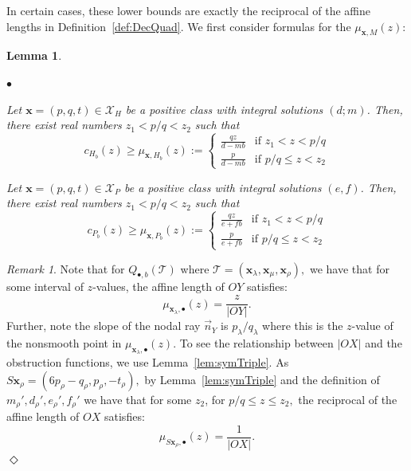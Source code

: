 \documentclass[11pt, reqno]{amsart}
\newtheorem{lemma}[thm]{Lemma}
\theoremstyle{remark}
\numberwithin{equation}{subsection}
\numberwithin{figure}{section}
\theoremstyle{customremark}
\newtheorem{rmk_no_diamond}[thm]{Remark}
\newenvironment{rmk}{\begin{rmk_no_diamond} } {\hfill$\er$ \end{rmk_no_diamond}}
\newcommand{\Tt}{\mathcal{T}}
\newenvironment{itemlist}
   { \begin{list} {$\bullet$}
         { \setlength{\topsep}{.5ex}  \setlength{\itemsep}{.5ex} \setlength{\leftmargin}{2.5ex} } }
   { \end{list} }
\newcommand{\vn}{{\vec{n}}}
\newcommand{\la}{{\lambda}}
\newcommand{\er}{{\Diamond}}
\newcommand{\X}{\mathcal{X}}
\begin{document}
In certain cases, these lower bounds are exactly the reciprocal of the affine lengths in Definition~\ref{def:DecQuad}. We first consider formulas for the $\mu_{\bm{x},M}(z)$:



\begin{lemma}\label{lem:obsFunction}
    \begin{itemlist}
        \item[{(i)}]\cite[Lemma 16]{ICERM} Let $\bm{x}=(p,q,t) \in \X_H$ be a positive class with integral solutions $(d;m)$. Then, there exist real numbers $z_1<p/q<z_2$ such that 
        \[ c_{H_b}(z) \geq \mu_{\bm{x},H_b}(z):=\begin{cases}
            \frac{qz}{d-mb} & \text{if $z_1<z<p/q$} \\
            \frac{p}{d-mb} & \text{if $p/q \leq z < z_2$}
        \end{cases}\]
        \item[{(ii)}] Let $\bm{x}=(p,q,t) \in \X_P$ be a positive class with integral solutions $(e,f)$. Then, there exist real numbers $z_1<p/q<z_2$ such that 
        \[ c_{P_b}(z) \geq \mu_{\bm{x},P_b}(z):= \begin{cases}
            \frac{qz}{e+fb} & \text{if $z_1<z<p/q$} \\
            \frac{p}{e+fb} & \text{if $p/q \leq z < z_2$}
        \end{cases}\]
    \end{itemlist}
\end{lemma}


\begin{rmk} \label{rmk:obsAndDiagrams}
    Note that for $Q_{\bullet,b}(\Tt)$ where $\Tt=(\bm{x}_\la,\bm{x}_\mu,\bm{x}_\rho),$ we have that for some interval of $z$-values, the affine length of $OY$ satisfies: 
    \[ \mu_{\bm{x}_\la,\bullet}(z)=\frac{z}{|OY|}.\]
    Further, note the slope of the nodal ray $\vn_Y$ is $p_\la/q_\la$ where this is the $z$-value of the nonsmooth point in $\mu_{\bm{x}_\la,\bullet}(z).$
    To see the relationship between $|OX|$ and the obstruction functions, we use Lemma~\ref{lem:symTriple}. As $S\bm{x}_\rho=(6p_\rho-q_\rho,p_\rho,-t_\rho),$ by Lemma~\ref{lem:symTriple} and the definition of $m_\rho',d_\rho',e_\rho',f_\rho'$ we have that for some $z_2$, for $p/q \leq z \leq z_2,$ the reciprocal of the affine length of $OX$ satisfies:
    \[ \mu_{S\bm{x}_\rho,\bullet}(z)=\frac{1}{|OX|}.\] 
\end{rmk}
 
\end{document}
